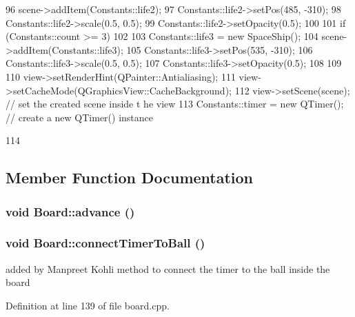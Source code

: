 \begin{DoxyCode}
{{96         scene->addItem(Constants::life2);
97         Constants::life2->setPos(485, -310);
98         Constants::life2->scale(0.5, 0.5);
99         Constants::life2->setOpacity(0.5);
100     }
101     if (Constants::count >= 3)
102     {
103         Constants::life3 = new SpaceShip();
104         scene->addItem(Constants::life3);
105         Constants::life3->setPos(535, -310);
106         Constants::life3->scale(0.5, 0.5);
107         Constants::life3->setOpacity(0.5);
108     }
109 
110     view->setRenderHint(QPainter::Antialiasing);
111     view->setCacheMode(QGraphicsView::CacheBackground);
112     view->setScene(scene);                      // set the created scene inside t
      he view
113     Constants::timer = new QTimer();            // create a new QTimer() instance
      
114 }
\end{DoxyCode}


\subsection{Member Function Documentation}
\hypertarget{class_board_ac8cfdf1b82b292e2ed461b49356a4c94}{
\subsubsection[{advance}]{\setlength{\rightskip}{0pt plus 5cm}void Board::advance ()}}
\label{class_board_ac8cfdf1b82b292e2ed461b49356a4c94}
\hypertarget{class_board_acadca09d3bbda3b396b788ec43838dc9}{
\subsubsection[{connectTimerToBall}]{\setlength{\rightskip}{0pt plus 5cm}void Board::connectTimerToBall ()}}
\label{class_board_acadca09d3bbda3b396b788ec43838dc9}
added by Manpreet Kohli method to connect the timer to the ball inside the board 

Definition at line 139 of file board.cpp.



